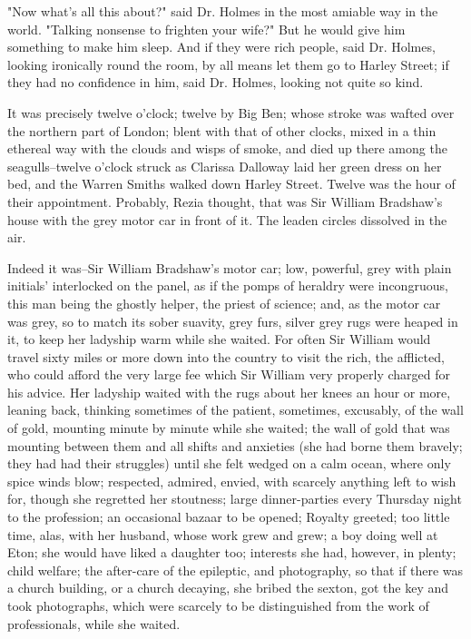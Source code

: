 \documentclass[lang=cn,10pt]{elegantbook}
\begin{document}
"Now what's all this about?" said Dr. Holmes in the most amiable
way in the world.  "Talking nonsense to frighten your wife?"  But
he would give him something to make him sleep.  And if they were
rich people, said Dr. Holmes, looking ironically round the room, by
all means let them go to Harley Street; if they had no confidence
in him, said Dr. Holmes, looking not quite so kind.

It was precisely twelve o'clock; twelve by Big Ben; whose stroke
was wafted over the northern part of London; blent with that of
other clocks, mixed in a thin ethereal way with the clouds and
wisps of smoke, and died up there among the seagulls--twelve
o'clock struck as Clarissa Dalloway laid her green dress on her
bed, and the Warren Smiths walked down Harley Street.  Twelve was
the hour of their appointment.  Probably, Rezia thought, that was
Sir William Bradshaw's house with the grey motor car in front of
it.  The leaden circles dissolved in the air.

Indeed it was--Sir William Bradshaw's motor car; low, powerful,
grey with plain initials' interlocked on the panel, as if the pomps
of heraldry were incongruous, this man being the ghostly helper,
the priest of science; and, as the motor car was grey, so to match
its sober suavity, grey furs, silver grey rugs were heaped in it,
to keep her ladyship warm while she waited.  For often Sir William
would travel sixty miles or more down into the country to visit the
rich, the afflicted, who could afford the very large fee which Sir
William very properly charged for his advice.  Her ladyship waited
with the rugs about her knees an hour or more, leaning back,
thinking sometimes of the patient, sometimes, excusably, of the
wall of gold, mounting minute by minute while she waited; the wall
of gold that was mounting between them and all shifts and anxieties
(she had borne them bravely; they had had their struggles) until
she felt wedged on a calm ocean, where only spice winds blow;
respected, admired, envied, with scarcely anything left to wish
for, though she regretted her stoutness; large dinner-parties every
Thursday night to the profession; an occasional bazaar to be
opened; Royalty greeted; too little time, alas, with her husband,
whose work grew and grew; a boy doing well at Eton; she would have
liked a daughter too; interests she had, however, in plenty; child
welfare; the after-care of the epileptic, and photography, so that
if there was a church building, or a church decaying, she bribed
the sexton, got the key and took photographs, which were scarcely
to be distinguished from the work of professionals, while she
waited.
\end{document}
